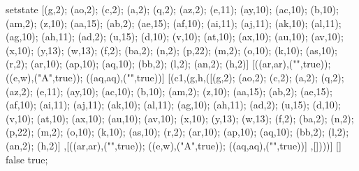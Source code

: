 setstate [(g,2); (ao,2); (c,2); (a,2); (q,2); (az,2); (e,11); (ay,10); (ac,10); (b,10); (am,2); (z,10); (aa,15); (ab,2); (ae,15); (af,10); (ai,11); (aj,11); (ak,10); (al,11); (ag,10); (ah,11); (ad,2); (u,15); (d,10); (v,10); (at,10); (ax,10); (au,10); (av,10); (x,10); (y,13); (w,13); (f,2); (ba,2); (n,2); (p,22); (m,2); (o,10); (k,10); (as,10); (r,2); (ar,10); (ap,10); (aq,10); (bb,2); (l,2); (an,2); (h,2)] [((ar,ar),("",true)); ((e,w),("\state A",true)); ((aq,aq),("",true))] [(c1,(g,h,([(g,2); (ao,2); (c,2); (a,2); (q,2); (az,2); (e,11); (ay,10); (ac,10); (b,10); (am,2); (z,10); (aa,15); (ab,2); (ae,15); (af,10); (ai,11); (aj,11); (ak,10); (al,11); (ag,10); (ah,11); (ad,2); (u,15); (d,10); (v,10); (at,10); (ax,10); (au,10); (av,10); (x,10); (y,13); (w,13); (f,2); (ba,2); (n,2); (p,22); (m,2); (o,10); (k,10); (as,10); (r,2); (ar,10); (ap,10); (aq,10); (bb,2); (l,2); (an,2); (h,2)] ,[((ar,ar),("",true)); ((e,w),("\state A",true)); ((aq,aq),("",true))] ,[])))] [] false true;
